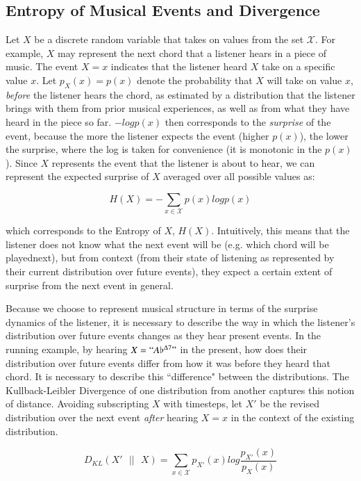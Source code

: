 \documentclass[final,authoryear,5p,times,twocolumn]{elsarticle}
\begin{document}
 \subsection{Entropy of Musical Events and Divergence}
 
Let $X$ be a discrete random variable that takes on values from the set $\mathcal{X}$. For example, $X$ may represent the next chord that a listener hears in a piece of music. The event $X=x$ indicates that the listener heard $X$ take on a specific value $x$. Let $p_X(x) = p(x)$ denote the probability that $X$ will take on value $x$, \textit{before} the listener hears the chord, as estimated by a distribution that the listener brings with them from prior musical experiences, as well as from what they have heard in the piece so far. $-logp(x)$ then corresponds to the \textit{surprise} of the event, because the more the listener expects the event (higher $p(x)$), the lower the surprise, where the log is taken for convenience (it is monotonic in the $p(x)$). Since $X$ represents the event that the listener is about to hear, we can represent the expected surprise of $X$ averaged over all possible values as:
 
 $$ H(X) = - \sum_{x \in \mathcal{X}} p(x) logp(x)$$
 
\noindent which corresponds to the Entropy of $X$, $H(X)$. Intuitively, this means that the listener does not know what the next event will be (e.g. which chord will be playednext), but from context (from their state of listening as represented by their current distribution over future events), they expect a certain extent of surprise from the next event in general.

Because we choose to represent musical structure in terms of the surprise dynamics of the listener, it is necessary to describe the way in which the listener's distribution over future events changes as they hear present events. In the running example, by hearing $X=``A\flat^{\Delta7}"$ in the present, how does their distribution over future events differ from how it was before they heard that chord. It is necessary to describe this ``difference" between the distributions. The Kullback-Leibler Divergence of one distribution from another captures this notion of distance. Avoiding subscripting $X$ with timesteps, let  $X'$ be the revised distribution over the next event \textit{after} hearing $X=x$ in the context of the existing distribution.

$$ D_{KL}(X'\textrm{ }|| \textrm{ } X) =  \sum_{x \in \mathcal{X}} p_{X'}(x) log\frac{p_{X'}(x) }{p_{X}(x)}$$
\end{document}
